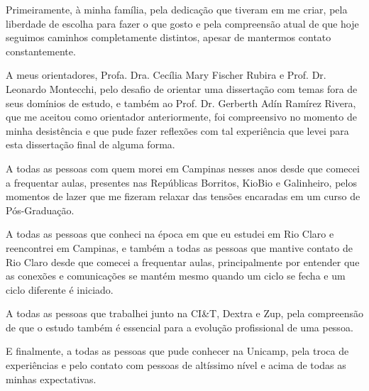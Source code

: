 \documentclass[Portugues,Final]{ic-tese-v3}
\begin{document}
Primeiramente, à minha família, pela dedicação que tiveram em me criar, pela liberdade de escolha para fazer o que gosto e pela compreensão atual de que hoje seguimos caminhos completamente distintos, apesar de mantermos contato constantemente.

A meus orientadores, Profa. Dra. Cecília Mary Fischer Rubira e Prof. Dr. Leonardo Montecchi, pelo desafio de orientar uma dissertação com temas fora de seus domínios de estudo, e também ao Prof. Dr. Gerberth Adín Ramírez Rivera, que me aceitou como orientador anteriormente, foi compreensivo no momento de minha desistência e que pude fazer reflexões com tal experiência que levei para esta dissertação final de alguma forma.

A todas as pessoas com quem morei em Campinas nesses anos desde que comecei a frequentar aulas, presentes nas Repúblicas Borritos, KioBio e Galinheiro, pelos momentos de lazer que me fizeram relaxar das tensões encaradas em um curso de Pós-Graduação.

A todas as pessoas que conheci na época em que eu estudei em Rio Claro e reencontrei em Campinas, e também a todas as pessoas que mantive contato de Rio Claro desde que comecei a frequentar aulas, principalmente por entender que as conexões e comunicações se mantém mesmo quando um ciclo se fecha e um ciclo diferente é iniciado.

A todas as pessoas que trabalhei junto na CI\&T, Dextra e Zup, pela compreensão de que o estudo também é essencial para a evolução profissional de uma pessoa.

E finalmente, a todas as pessoas que pude conhecer na Unicamp, pela troca de experiências e pelo contato com pessoas de altíssimo nível e acima de todas as minhas expectativas.
\end{document}
